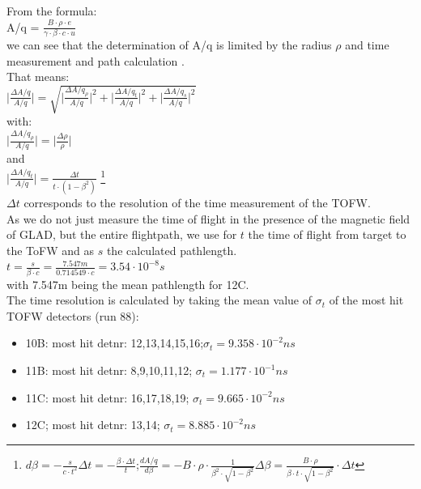 \documentclass[12pt, letterpaper]{article}
\begin{document}
From the formula:\\
A/q = $\frac{B \cdot \rho \cdot e}{\gamma\cdot\beta \cdot c \cdot u}$ \\
we can see that the determination of A/q is limited by the radius $\rho$ and time measurement and path calculation .\\
That means:\\
\newline
$\Big|\frac{\Delta A/q}{A/q}\Big| = \sqrt{\big|\frac{\Delta A/q_{\rho}}{A/q}\big|^{2} + \big|\frac{\Delta A/q_{t}}{A/q}\big|^{2} +\big|\frac{\Delta A/q_{s}}{A/q} \big|^{2}  }$ \\
with:\\
$\big|\frac{\Delta A/q_{\rho}}{A/q}\big| = \big|\frac{\Delta\rho}{\rho}\big|$\\
and\\
$\big|\frac{\Delta A/q_{t}}{A/q}\big| = \frac{\Delta t}{t\cdot(1-\beta^{2})}$ \footnote{$d\beta = -\frac{s}{c\cdot t^{2}}\Delta t = -\frac{\beta \cdot \Delta t}{t}$;\hspace{1cm}$\frac{dA/q}{d\beta} = -B\cdot\rho\cdot\frac{1}{\beta^{2}\cdot\sqrt{1-\beta^{2}}}\Delta\beta = \frac{B\cdot \rho}{\beta \cdot t \cdot \sqrt{1-\beta^{2}}}\cdot \Delta t$}\\
$\Delta t$ corresponds to the resolution of the time measurement of the TOFW.\\
As we do not just measure the time of flight in the presence of the magnetic field of GLAD, but the entire flightpath, we use for $t$ the time of flight from target to the ToFW and as $s$ the calculated pathlength. \\
$t = \frac{s}{\beta\cdot c} =  \frac{7.547m}{0.714549\cdot c} = 3.54\cdot10^{-8}s$\\
with 7.547m being the mean pathlength for 12C.\\
The time resolution is calculated by taking the mean value of $\sigma_{t}$ of the most hit TOFW detectors (run 88):\\
\begin{itemize}
\item 10B: most hit detnr: 12,13,14,15,16;$\sigma_{t} = 9.358 \cdot 10^{-2} ns$
\item 11B: most hit detnr: 8,9,10,11,12;   $\sigma_{t} = 1.177\cdot 10^{-1} ns$
\item 11C: most hit detnr: 16,17,18,19; $\sigma_{t} = 9.665 \cdot 10^{-2} ns$
\item 12C; most hit detnr: 13,14; $\sigma_{t} = 8.885\cdot 10^{-2} ns$
\end{itemize}
\end{document}
